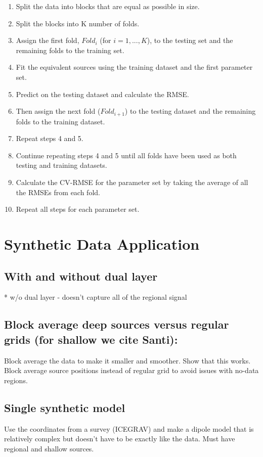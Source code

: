 \begin{enumerate}
    \item Split the data into blocks that are equal as possible in size.
    \item Split the blocks into K number of folds.
    \item Assign the first fold, $Fold_i$ (for $i= 1,..., K$), to the testing set and the remaining folds to the training set.
    \item Fit the equivalent sources using the training dataset and the first parameter set.
    \item Predict on the testing dataset and calculate the RMSE.
    \item Then assign the next fold ($Fold_{i+1}$) to the testing dataset and the remaining folds to the training dataset.
    \item Repeat steps 4 and 5.
    \item Continue repeating steps 4 and 5 until all folds have been used as both testing and training datasets.
    \item Calculate the CV-RMSE for the parameter set by taking the average of all the RMSEs from each fold.
    \item Repeat all steps for each parameter set.
\end{enumerate}

 


\section{Synthetic Data Application}

\subsection{With and without dual layer}
* w/o dual layer - doesn't capture all of the regional signal

\subsection{Block average deep sources versus regular grids (for shallow we cite Santi):}
Block average the data to make it smaller and smoother. Show that this works.
Block average source positions instead of regular grid to avoid issues with no-data regions.

\subsection{Single synthetic model}
Use the coordinates from a survey (ICEGRAV) and make a dipole model that is relatively complex but doesn't have to be exactly like the data. Must have regional and shallow sources.


